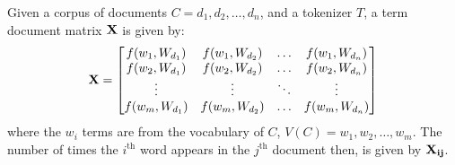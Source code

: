 \begin{definition}
  Given a corpus of documents $C=d_1,d_2,\dots,d_n$, and a tokenizer $T$, a term document matrix $\bf{X}$ is given by:
  \begin{equation}
    \bf{X}=
  \begin{bmatrix}
    f(w_1, W_{d_1}) & f(w_1, W_{d_2}) & \dots  & f(w_1, W_{d_n}) \\
    f(w_2, W_{d_1}) & f(w_2, W_{d_2}) & \dots  & f(w_2, W_{d_n}) \\
    \vdots        & \vdots        & \ddots & \vdots          \\
    f(w_m, W_{d_1}) & f(w_m, W_{d_2}) & \dots  & f(w_m, W_{d_n}) \\
  \end{bmatrix}
  \end{equation}
  where the $w_i$ terms are from the vocabulary of $C$, $V(C)=w_1,w_2,\dots,w_m$.
  The number of times the $i^{\text{th}}$ word appears in the $j^{\text{th}}$ document then, is given by $\bf{X}_{ij}$.
\end{definition}

